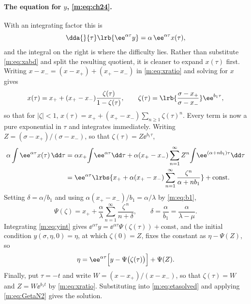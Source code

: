 \paragraph{The equation for $y$, \eqref{m:eq:ch24}.}
With an integrating factor this is
\begin{equation}
\label{m:eq:yint}
\dda{}{\tau}\lrb{\ee^{\alpha\tau}y} = \alpha\,\ee^{\alpha\tau}x(\tau),
\end{equation}
and the integral on the right is where the difficulty lies. Rather than substitute
\cref{m:eq:xabd} and split the resulting quotient, it is cleaner to expand
$x(\tau)$ first. Writing $x-x_- = (x-x_+)+(x_+-x_-)$ in \cref{m:eq:xratio} and
solving for $x$ gives
\begin{equation}
\label{m:eq:xgeom}
x(\tau) = x_+ + (x_+-x_-)\frac{\zeta(\tau)}{1-\zeta(\tau)},
\qquad
\zeta(\tau) = \lrb{\frac{\sigma-x_+}{\sigma-x_-}}\ee^{b_1\tau},
\end{equation}
so that for $|\zeta|<1$,
$x(\tau) = x_+ + (x_+-x_-)\sum_{n\ge1}\zeta(\tau)^n$. Every term is now a pure
exponential in $\tau$ and integrates immediately. Writing
$Z = (\sigma-x_+)/(\sigma-x_-)$, so that $\zeta(\tau)=Z\ee^{b_1\tau}$,
\begin{align*}
\alpha\int\ee^{\alpha\tau}x(\tau)\,\dd\tau
&= \alpha x_+\!\int\!\ee^{\alpha\tau}\dd\tau
 + \alpha(x_+-x_-)\sum_{n=1}^{\infty}Z^n\!\int\!\ee^{(\alpha+nb_1)\tau}\dd\tau\\
&= \ee^{\alpha\tau}\lrbs{x_+ + \alpha(x_+-x_-)\sum_{n=1}^{\infty}\frac{\zeta^n}{\alpha+nb_1}}
 + \text{const} .
\end{align*}
Setting $\delta = \alpha/b_1$ and using $\alpha(x_+-x_-)/b_1 = \alpha/\lambda$ by
\cref{m:eq:b1},
\begin{equation}
\label{m:eq:Psidef}
\Psi(\zeta) = x_+ + \frac{\alpha}{\lambda}\sum_{n=1}^{\infty}\frac{\zeta^{\,n}}{n+\delta},
\qquad
\delta = \frac{\alpha}{b_1} = \frac{\alpha}{\lambda-\mu} .
\end{equation}
Integrating \cref{m:eq:yint} gives
$\ee^{\alpha\tau}y = \ee^{\alpha\tau}\Psi(\zeta(\tau))+\text{const}$, and the
initial condition $y(\sigma,\eta,0)=\eta$, at which $\zeta(0)=Z$, fixes the constant
as $\eta-\Psi(Z)$, so
\begin{equation}
\label{m:eq:etasolved}
\eta = \ee^{\alpha\tau}\Bigl[y-\Psi\bigl(\zeta(\tau)\bigr)\Bigr] + \Psi(Z) .
\end{equation}
Finally, put $\tau=-t$ and write $W = (x-x_+)/(x-x_-)$, so that $\zeta(\tau)=W$ and
$Z = W\ee^{b_1t}$ by \cref{m:eq:xratio}. Substituting into \cref{m:eq:etasolved} and
applying \cref{m:eq:GetaN2} gives the solution.

